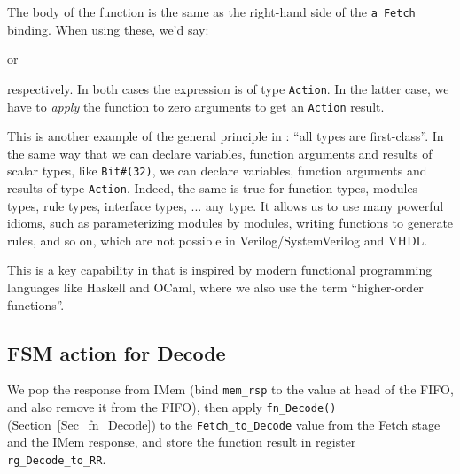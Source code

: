 The body of the function is the same as the right-hand side of the
\verb|a_Fetch| binding.  When using these, we'd say:

\begin{center}
 \hmm or \hmm {}
\end{center}

respectively.  In both cases the expression is of type \verb|Action|.
In the latter case, we have to \emph{apply} the function to zero
arguments to get an {\tt Action} result.


This is another example of the general principle in {\BSV}: ``all
types are first-class''.  In the same way that we can declare
variables, function arguments and results of scalar types, like
\verb|Bit#(32)|, we can declare variables, function arguments and
results of type {\tt Action}.  Indeed, the same is true for function
types, modules types, rule types, interface types, ... any type.  It
allows us to use many powerful idioms, such as parameterizing modules
by modules, writing functions to generate rules, and so on, which are
not possible in Verilog/SystemVerilog and VHDL.



This is a key capability in {\BSV} that is inspired by modern
functional programming languages like Haskell and OCaml, where we also
use the term ``higher-order functions''.


\subsection{FSM action for Decode}


We pop the response from IMem (bind \verb|mem_rsp| to the value at
head of the FIFO, and also remove it from the FIFO), then apply
\verb|fn_Decode()| (Section~\ref{Sec_fn_Decode}) to the
\verb|Fetch_to_Decode| value from the Fetch stage and the IMem
response, and store the function result in register
\verb|rg_Decode_to_RR|.



